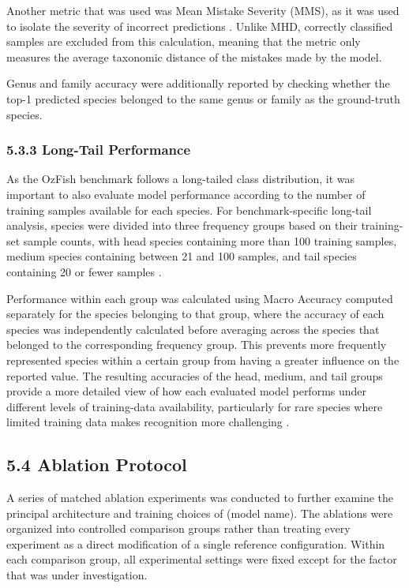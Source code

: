 \documentclass[preprint,12pt]{elsarticle}
\begin{document}
Another metric that was used was Mean Mistake Severity (MMS), as it was
used to isolate the severity of incorrect predictions
\cite{ref24}. Unlike MHD, correctly classified
samples are excluded from this calculation, meaning that the metric only
measures the average taxonomic distance of the mistakes made by the
model.

Genus and family accuracy were additionally reported by checking whether
the top-1 predicted species belonged to the same genus or family as the
ground-truth species.

\subsubsection*{5.3.3 Long-Tail
Performance}\label{long-tail-performance}

As the OzFish benchmark follows a long-tailed class distribution, it was
important to also evaluate model performance according to the number of
training samples available for each species. For benchmark-specific
long-tail analysis, species were divided into three frequency groups
based on their training-set sample counts, with head species containing
more than 100 training samples, medium species containing between 21 and
100 samples, and tail species containing 20 or fewer samples
\cite{ref16}.

Performance within each group was calculated using Macro Accuracy
computed separately for the species belonging to that group, where the
accuracy of each species was independently calculated before averaging
across the species that belonged to the corresponding frequency group.
This prevents more frequently represented species within a certain group
from having a greater influence on the reported value. The resulting
accuracies of the head, medium, and tail groups provide a more detailed
view of how each evaluated model performs under different levels of
training-data availability, particularly for rare species where limited
training data makes recognition more challenging
\cite{ref15}
\cite{ref16}.

\subsection*{5.4 Ablation Protocol}\label{ablation-protocol}

A series of matched ablation experiments was conducted to further
examine the principal architecture and training choices of (model name).
The ablations were organized into controlled comparison groups rather
than treating every experiment as a direct modification of a single
reference configuration. Within each comparison group, all experimental
settings were fixed except for the factor that was under investigation.
\end{document}
